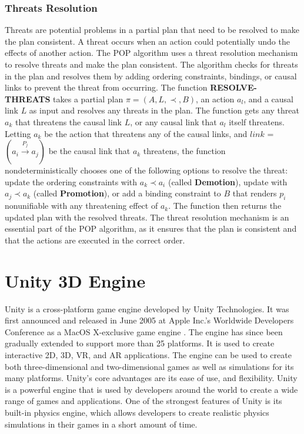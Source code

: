 \subsubsection{Threats Resolution} \label{subsubsec:threat_resolution}
Threats are potential problems in a partial plan that need to be resolved to make the plan consistent. A threat occurs when an action could potentially undo the effects of another action. The \ac{POP} algorithm uses a threat resolution mechanism to resolve threats and make the plan consistent. The algorithm checks for threats in the plan and resolves them by adding ordering constraints, bindings, or causal links to prevent the threat from occurring. The function \textbf{RESOLVE-THREATS} takes a partial plan $\pi = (A, L, \prec, B)$, an action $a_l$, and a causal link $L$ as input and resolves any threats in the plan.
The function gets any threat $a_k$ that threatens the causal link $L$, or any causal link that $a_l$ itself threatens. Letting $a_k$ be the action that threatens any of the causal links, and $link$ = $(a_i \xrightarrow{\text{$P_j$}} a_j)$ be the causal link that $a_k$ threatens, the function nondeterministically chooses one of the following options to resolve the threat: update the ordering constraints with $a_k \prec a_i$ (called \textbf{Demotion}), update with $a_j \prec a_k$ (called \textbf{Promotion}), or add a binding constraint to $B$ that renders $p_i$ nonunifiable with any threatening effect of $a_k$. The function then returns the updated plan with the resolved threats.
The threat resolution mechanism is an essential part of the \ac{POP} algorithm, as it ensures that the plan is consistent and that the actions are executed in the correct order.


\section{Unity 3D Engine} \label{sec:unity3d}
Unity is a cross-platform game engine developed by Unity Technologies. It was first announced and released in June 2005 at Apple Inc.'s Worldwide Developers Conference as a MacOS X-exclusive game engine \cite{WikiUnity}. The engine has since been gradually extended to support more than 25 platforms. It is used to create interactive 2D, 3D, \ac{VR}, and \ac{AR} applications. The engine can be used to create both three-dimensional and two-dimensional games as well as simulations for its many platforms. Unity's core advantages are its ease of use, and flexibility. Unity is a powerful engine that is used by developers around the world to create a wide range of games and applications.
One of the strongest features of Unity is its built-in physics engine, which allows developers to create realistic physics simulations in their games in a short amount of time.

